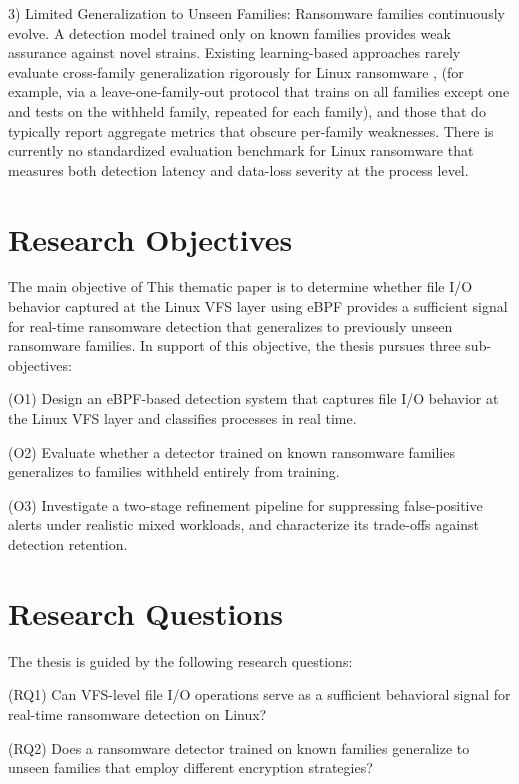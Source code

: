 3) Limited Generalization to Unseen Families: Ransomware families continuously evolve. A detection model trained only on known families provides weak assurance against novel strains. Existing learning-based approaches rarely evaluate cross-family generalization rigorously for Linux ransomware \cite{ref17}, \cite{ref18} (for example, via a leave-one-family-out protocol that trains on all families except one and tests on the withheld family, repeated for each family), and those that do typically report aggregate metrics that obscure per-family weaknesses. There is currently no standardized evaluation benchmark for Linux ransomware that measures both detection latency and data-loss severity at the process level.

\section{Research Objectives}\label{sec:1.3}

The main objective of This thematic paper is to determine whether file I/\allowbreak{}O behavior captured at the Linux VFS layer using eBPF provides a sufficient signal for real-time ransomware detection that generalizes to previously unseen ransomware families. In support of this objective, the thesis pursues three sub-objectives:

(O1)	Design an eBPF-based detection system that captures file I/\allowbreak{}O behavior at the Linux VFS layer and classifies processes in real time.

(O2)	Evaluate whether a detector trained on known ransomware families generalizes to families withheld entirely from training.

(O3)	Investigate a two-stage refinement pipeline for suppressing false-positive alerts under realistic mixed workloads, and characterize its trade-offs against detection retention.

\section{Research Questions}\label{sec:1.4}

The thesis is guided by the following research questions:

(RQ1)	Can VFS-level file I/\allowbreak{}O operations serve as a sufficient behavioral signal for real-time ransomware detection on Linux?

(RQ2)	Does a ransomware detector trained on known families generalize to unseen families that employ different encryption strategies?

